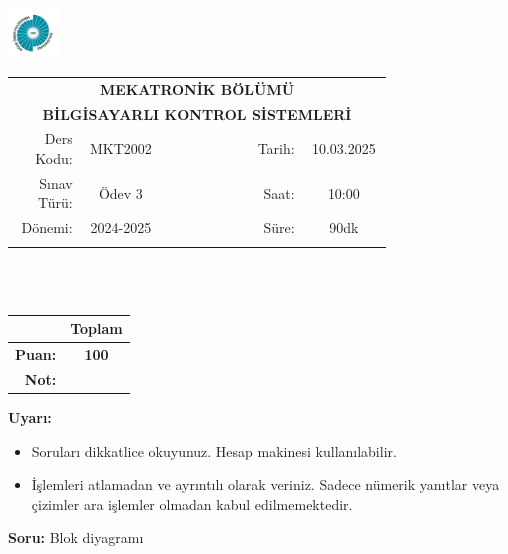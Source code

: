 \newcommand\UniversiteAdi{Niğde Ömer Halisdemir Üniversitesi}
\newcommand\BolumAdi{MEKATRONİK BÖLÜMÜ}
\newcommand\DersKodu{MKT2002}
\newcommand\DersAdi{BİLGİSAYARLI KONTROL SİSTEMLERİ}
\newcommand\SinavAdi{Ödev 3}
\newcommand\SinavTarihi{10.03.2025}
\newcommand\SinavSaati{10:00}
\newcommand\SinavSuresi{90dk}
\pagestyle{fancy}
\fancyhf{} %
\noindent \includegraphics[width=0.1\textwidth]{logo}
\begin{tabular}{
		p{0.15\linewidth}
		p{0.15\linewidth}
		p{0.2\linewidth}
		p{0.1\linewidth}
		p{0.15\linewidth}}
	\multicolumn{5}{c}{\textbf{\BolumAdi}}        \\
	\multicolumn{5}{c}{\textbf{\DersAdi}}         \\\hline
	\multicolumn{1}{|r|}{Ders Kodu:}  &
	\multicolumn{1}{|c|}{\DersKodu}   &
	\multicolumn{1}{|c|}{}            &
	\multicolumn{1}{|r|}{Tarih:}      &
	\multicolumn{1}{|c|}{\SinavTarihi}            \\\hline
	\multicolumn{1}{|r|}{Sınav Türü:} &
	\multicolumn{1}{|c|}{\SinavAdi}   &
	\multicolumn{1}{|c|}{}            &
	\multicolumn{1}{|r|}{Saat:}       &
	\multicolumn{1}{|c|}{\SinavSaati}             \\\hline
	\multicolumn{1}{|r|}{Dönemi:}     &
	\multicolumn{1}{|c|}{2024-2025}   &
	\multicolumn{1}{|c|}{}            &
	\multicolumn{1}{|r|}{Süre:}       &
	\multicolumn{1}{|c|}{\SinavSuresi}            \\\hline
	                                  &   &  &  & \\
\end{tabular}\\\\
\noindent\begin{center}
	\begin{tabular}{|r|c|}\hline
		               & \textbf{Toplam} \\\hline
		\textbf{Puan:} & \textbf{100}    \\\hline
		\textbf{Not:}  &                 \\\hline
	\end{tabular}\end{center}
\noindent\textbf{Uyarı:}
\begin{itemize}\bfseries
	\item Soruları dikkatlice okuyunuz. Hesap makinesi kullanılabilir.
	\item İşlemleri atlamadan ve ayrıntılı olarak veriniz. Sadece nümerik yanıtlar veya çizimler ara işlemler olmadan kabul edilmemektedir.
\end{itemize}
\noindent\textbf{Soru:} Blok diyagramı

